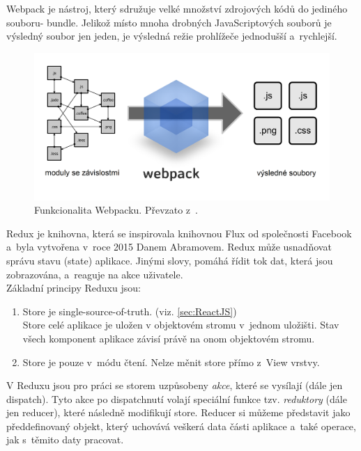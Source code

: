 
Webpack je nástroj, který sdružuje velké množství zdrojových kódů do jediného souboru- bundle. Jelikož místo mnoha drobných JavaScriptových souborů je výsledný soubor jen jeden, je výsledná režie prohlížeče jednodušší a~rychlejší.\cite{21} \\

\begin{figure}[H]
	\centering
	\includegraphics[width=15cm]{../webpack.png}
	\caption{Funkcionalita Webpacku. Převzato z~\cite{21}.}	
	\label{fig:Webpack}
\end{figure}


Redux je knihovna, která se inspirovala knihovnou Flux od společnosti Facebook a~byla vytvořena v~roce 2015 Danem Abramovem. Redux může usnadňovat správu stavu (state) aplikace. Jinými slovy, pomáhá řídit tok dat, která jsou zobrazována, a~reaguje na akce uživatele. \\
Základní principy Reduxu jsou:

\begin{enumerate}
	\item Store je single-source-of-truth. (viz. \ref{sec:ReactJS}) \\
		Store celé aplikace je uložen v objektovém stromu v~jednom uložišti. Stav všech komponent aplikace závisí právě na onom objektovém stromu.
	\item Store je pouze v~módu čtení. 
		Nelze měnit store přímo z~View vrstvy.
\end{enumerate}

V Reduxu jsou pro práci se storem uzpůsobeny \textit{akce}, které se vysílají (dále jen dispatch). Tyto akce po dispatchnutí volají speciální funkce tzv. \textit{reduktory} (dále jen reducer), které následně modifikují store. Reducer si můžeme představit jako předdefinovaný objekt, který uchovává veškerá data části aplikace a~také operace, jak s~těmito daty pracovat.
 
